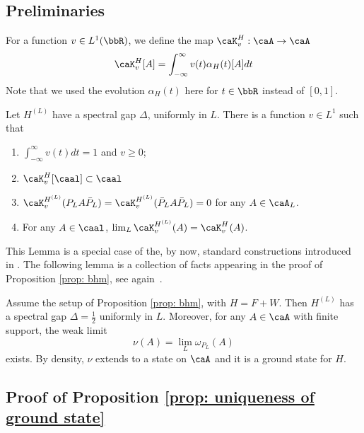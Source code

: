 \subsection{Preliminaries}


For a function $v \in L^1(\bbR)$,
we define the map $\caK^H_v: \caA\to\caA$
\begin{equation*}
\caK^{H}_v[A] = \int_{-\infty}^\infty  v(t)\alpha_H(t)[A]dt
\end{equation*}
Note that we used the evolution $\alpha_H(t)$ here for $t\in \bbR$ instead of $[0,1]$.
\begin{lemma}\label{lem: Block diagonalization} 
	Let $H^{(L)}$ have a spectral gap $\Delta$, uniformly in $L$.  There is a function $v\in L^1$ such that 
	\begin{enumerate}
		\item $\int_{-\infty}^{\infty} v(t) dt=1$ and $v\geq 0$;
		\item  $\caK^{H}_v[\caal]\subset \caal$
		\item $\caK^{H^{(L)}}_v(P_LA\bar{P}_L)=\caK^{H^{(L)}}_v(\bar{P}_LA\bar{P}_L)=0$ for any $A\in \caA_L$.
		\item For any $A\in \caal$,  $\lim_L\caK^{H^{(L)}}_v(A)= \caK^{H^{}}_v(A)$.
	\end{enumerate}
\end{lemma}
This Lemma is a special case of the,  by now, standard constructions introduced in \cite{hastings2005quasiadiabatic,bachmann2012automorphic}. The following lemma is a collection of facts appearing in the proof of Proposition \ref{prop: bhm}, see again~\cite{nachtergaele2020quasi}.
\begin{lemma}\label{lem: limiting ground state} 
	Assume the setup of Proposition \ref{prop: bhm}, with $H=F+W$. Then $H^{(L)}$ has a spectral gap $\Delta=\tfrac{1}{2}$ uniformly in $L$.  Moreover, 
	for any $A\in \caA$ with finite support, the weak limit
	$$
	\nu(A)=\lim_L \omega_{P_L}(A)
	$$
	exists. By density, $\nu$ extends to a state on $\caA$ and it is a ground state for $H$.
\end{lemma}


\subsection{Proof of Proposition \ref{prop: uniqueness of ground state}}


